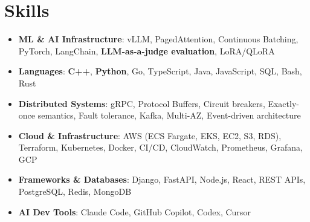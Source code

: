 \documentclass[letterpaper,11pt]{article}
\newcommand{\resumeSubHeadingListStart}{\begin{itemize}[leftmargin=0.15in, label={}]}
\newcommand{\resumeSubHeadingListEnd}{\end{itemize}}
\newcommand{\resumeSkillHeading}[2]{%
  \item\small{\textbf{#1}: #2 \vspace{-9pt}}%
}
\begin{document}
\section{Skills}
  \resumeSubHeadingListStart
    \resumeSkillHeading{ML \& AI Infrastructure}{vLLM, PagedAttention, Continuous Batching, PyTorch, LangChain, \textbf{LLM-as-a-judge evaluation}, LoRA/QLoRA}
    \resumeSkillHeading{Languages}{\textbf{C++}, \textbf{Python}, Go, TypeScript, Java, JavaScript, SQL, Bash, Rust}
    \resumeSkillHeading{Distributed Systems}{gRPC, Protocol Buffers, Circuit breakers, Exactly-once semantics, Fault tolerance, Kafka, Multi-AZ, Event-driven architecture}
    \resumeSkillHeading{Cloud \& Infrastructure}{AWS (ECS Fargate, EKS, EC2, S3, RDS), Terraform, Kubernetes, Docker, CI/CD, CloudWatch, Prometheus, Grafana, GCP}
    \resumeSkillHeading{Frameworks \& Databases}{Django, FastAPI, Node.js, React, REST APIs, PostgreSQL, Redis, MongoDB}
    \resumeSkillHeading{AI Dev Tools}{Claude Code, GitHub Copilot, Codex, Cursor}
  \resumeSubHeadingListEnd
\end{document}
